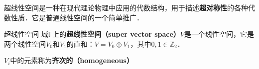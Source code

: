 

超线性空间是一种在现代理论物理中应用的代数结构，用于描述\textbf{超对称性}的各种代数性质．它是普通线性空间的一个简单推广．

\begin{definition}{超线性空间}
域$\mathbb{F}$上的\textbf{超线性空间（super vector space）}$V$是一个线性空间，它是两个线性空间$V_0$和$V_1$的直和：$V=V_0\oplus V_1$，其中$0, 1\in \mathbb{Z}_2$．

$V_i$中的元素称为\textbf{齐次的（homogeneous）}
\end{definition}
















